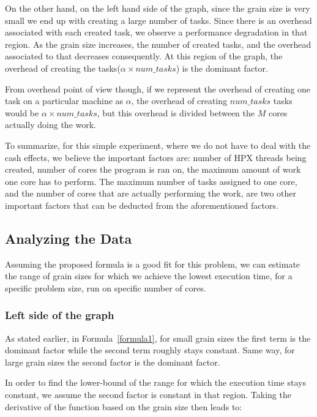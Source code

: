 On the other hand, on the left hand side of the graph, since the grain size is very small we end up with creating a large number of tasks. Since there is an overhead associated with each created task, we observe a performance degradation in that region. As the grain size increases, the number of created tasks, and the overhead associated to that decreases consequently. At this region of the graph, the overhead of creating the tasks($\alpha\times{num\_{tasks}}$) is the dominant factor.   





From overhead point of view though, if we represent the overhead of creating one task on a particular machine as $\alpha$, the overhead of creating $num\_{tasks}$ tasks would be $\alpha\times{num\_{tasks}}$, but this overhead is divided between the $M$ cores actually doing the work. 

To summarize, for this simple experiment, where we do not have to deal with the cash effects, we believe the important factors are: number of HPX threads being created, number of cores the program is ran on, the maximum amount of work one core has to perform. The maximum number of tasks assigned to one core, and the number of cores that are actually performing the work, are two other important factors that can be deducted from the aforementioned factors. 

\vspace{\baselineskip}
\subsection{Analyzing the Data}
Assuming the proposed formula is a good fit for this problem, we can estimate the range of grain sizes for which we achieve the lowest execution time, for a specific problem size, run on specific number of cores.

\subsubsection{Left side of the graph}
As stated earlier, in Formula~\ref{formula1}, for small grain sizes the first term is the dominant factor while the second term roughly stays constant. Same way, for large grain sizes the second factor is the dominant factor. 

In order to find the lower-bound of the range for which the execution time stays constant, we assume the second factor is constant in that region. Taking the derivative of the function based on the grain size then leads to:

